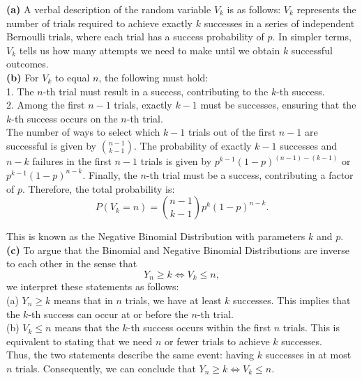 \begin{solution}
\textbf{(a)} A verbal description of the random variable \(V_k\) is as follows: \(V_k\) represents the number of trials required to achieve exactly \(k\) successes in a series of independent Bernoulli trials, where each trial has a success probability of \(p\). In simpler terms, \(V_k\) tells us how many attempts we need to make until we obtain \(k\) successful outcomes.\\

\textbf{(b)} For \(V_k\) to equal \(n\), the following must hold:\\

1. The \(n\)-th trial must result in a success, contributing to the \(k\)-th success.\\
2. Among the first \(n-1\) trials, exactly \(k-1\) must be successes, ensuring that the \(k\)-th success occurs on the \(n\)-th trial.\\

The number of ways to select which \(k-1\) trials out of the first \(n-1\) are successful is given by \(\binom{n-1}{k-1}\). The probability of exactly \(k-1\) successes and \(n-k\) failures in the first \(n-1\) trials is given by \(p^{k-1} (1 - p)^{(n-1) - (k-1)}\) or \(p^{k-1} (1 - p)^{n-k}\). Finally, the \(n\)-th trial must be a success, contributing a factor of \(p\). Therefore, the total probability is:
\[
P(V_k = n) = \binom{n-1}{k-1} p^{k} (1 - p)^{n-k}.
\]

This is known as the Negative Binomial Distribution with parameters \(k\) and \(p\).\\

\textbf{(c)} To argue that the Binomial and Negative Binomial Distributions are inverse to each other in the sense that
\[
Y_n \geq k \Leftrightarrow V_k \leq n,
\]
we interpret these statements as follows:\\

(a) \(Y_n \geq k\) means that in \(n\) trials, we have at least \(k\) successes. This implies that the \(k\)-th success can occur at or before the \(n\)-th trial.\\

(b) \(V_k \leq n\) means that the \(k\)-th success occurs within the first \(n\) trials. This is equivalent to stating that we need \(n\) or fewer trials to achieve \(k\) successes.\\

Thus, the two statements describe the same event: having \(k\) successes in at most \(n\) trials. Consequently, we can conclude that \(Y_n \geq k \Leftrightarrow V_k \leq n\).\\
\end{solution}


